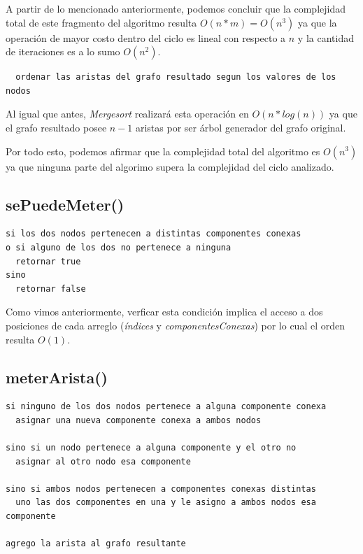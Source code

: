 \documentclass[a4paper,11pt] {article}
\begin{document}
A partir de lo mencionado anteriormente, podemos concluir que la complejidad total de este fragmento del algoritmo resulta $O(n*m) = O(n^3)$ ya que la operación de mayor costo dentro del ciclo es lineal con respecto a $n$ y la cantidad de iteraciones es a lo sumo $O(n^2)$.

\begin{verbatim}
  ordenar las aristas del grafo resultado segun los valores de los nodos
\end{verbatim}

Al igual que antes, \textit{Mergesort} realizará esta operación en $O(n*log(n))$ ya que el grafo resultado posee $n-1$ aristas por ser árbol generador del grafo original.

\bigskip
Por todo esto, podemos afirmar que la complejidad total del algoritmo es $O(n^3)$ ya que ninguna parte del algorimo supera la complejidad del ciclo analizado.

\subsection*{sePuedeMeter()}

\begin{verbatim}
si los dos nodos pertenecen a distintas componentes conexas
o si alguno de los dos no pertenece a ninguna
  retornar true
sino
  retornar false
\end{verbatim}

Como vimos anteriormente, verficar esta condición implica el acceso a dos posiciones de cada arreglo (\textit{índices} y \textit{componentesConexas}) por lo cual el orden resulta $O(1)$.

\subsection*{meterArista()}

\begin{verbatim}
si ninguno de los dos nodos pertenece a alguna componente conexa
  asignar una nueva componente conexa a ambos nodos

sino si un nodo pertenece a alguna componente y el otro no
  asignar al otro nodo esa componente

sino si ambos nodos pertenecen a componentes conexas distintas
  uno las dos componentes en una y le asigno a ambos nodos esa componente

agrego la arista al grafo resultante
\end{verbatim}
\end{document}
